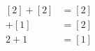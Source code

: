 \documentclass[preview]{standalone}
\begin{document}
\begin{align*}
\begin{aligned}[2] + [2] &= [2] \\[1] + [1] &= [2] \\2 + 1 &= [1]\end{aligned}
\end{align*}
\end{document}
